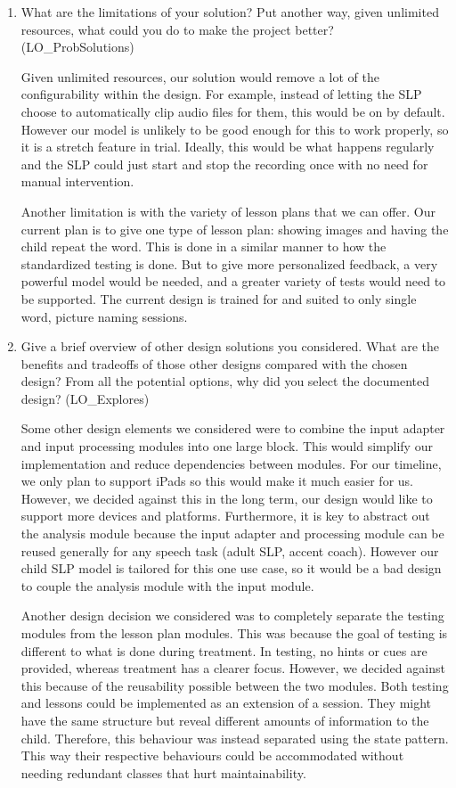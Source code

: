 \documentclass[12pt, titlepage]{article}
\begin{document}
\begin{enumerate}
  \item What are the limitations of your solution?  Put another way, given
  unlimited resources, what could you do to make the project better? (LO\_ProbSolutions)
  
  Given unlimited resources, our solution would remove a lot of the configurability within the design. For example, instead of letting the SLP choose to automatically clip audio files for them, this would be on by default. However our model is unlikely to be good enough for this to work properly, so it is a stretch feature in trial. Ideally, this would be what happens regularly and the SLP could just start and stop the recording once with no need for manual intervention. 

  Another limitation is with the variety of lesson plans that we can offer. Our current plan is to give one type of lesson plan: showing images and having the child repeat the word. This is done in a similar manner to how the standardized testing is done. But to give more personalized feedback, a very powerful model would be needed, and a greater variety of tests would need to be supported. The current design is trained for and suited to only single word, picture naming sessions. 

  
  \item Give a brief overview of other design solutions you considered.  What
  are the benefits and tradeoffs of those other designs compared with the chosen
  design?  From all the potential options, why did you select the documented design?
  (LO\_Explores)

  Some other design elements we considered were to combine the input adapter and input processing modules into one large block. This would simplify our implementation and reduce dependencies between modules. For our timeline, we only plan to support iPads so this would make it much easier for us. However, we decided against this in the long term, our design would like to support more devices and platforms. Furthermore, it is key to abstract out the analysis module because the input adapter and processing module can be reused generally for any speech task (adult SLP, accent coach). However our child SLP model is tailored for this one use case, so it would be a bad design to couple the analysis module with the input module. 

  Another design decision we considered was to completely separate the testing modules from the lesson plan modules. This was because the goal of testing is different to what is done during treatment. In testing, no hints or cues are provided, whereas treatment has a clearer focus. However, we decided against this because of the reusability possible between the two modules. Both testing and lessons could be implemented as an extension of a session. They might have the same structure but reveal different amounts of information to the child. Therefore, this behaviour was instead separated using the state pattern. This way their respective behaviours could be accommodated without needing redundant classes that hurt maintainability. 



\end{enumerate}
\end{document}
